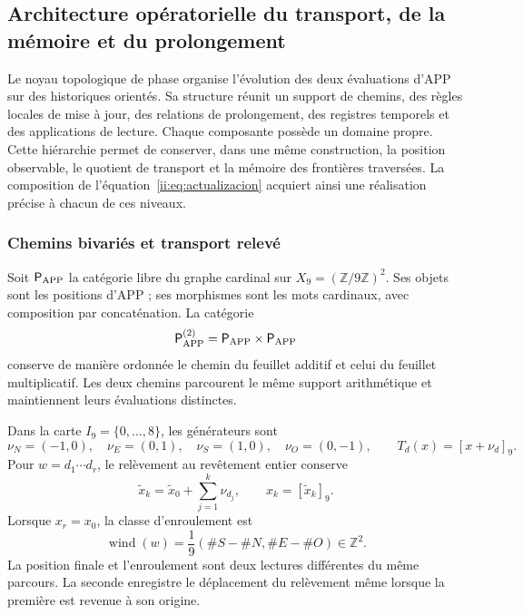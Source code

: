 \subsection{Architecture opératorielle du transport, de la mémoire et du prolongement}
\label{ii:ii:tpk-arquitectura}

Le noyau topologique de phase organise l'évolution des deux évaluations d'APP sur des historiques orientés. Sa structure réunit un support de chemins, des règles locales de mise à jour, des relations de prolongement, des registres temporels et des applications de lecture. Chaque composante possède un domaine propre. Cette hiérarchie permet de conserver, dans une même construction, la position observable, le quotient de transport et la mémoire des frontières traversées. La composition de l'équation~\eqref{ii:eq:actualizacion} acquiert ainsi une réalisation précise à chacun de ces niveaux.

\subsubsection{Chemins bivariés et transport relevé}

Soit \(\mathsf P_{\rm APP}\) la catégorie libre du graphe cardinal sur \(X_9=(\mathbb Z/9\mathbb Z)^2\). Ses objets sont les positions d'APP ; ses morphismes sont les mots cardinaux, avec composition par concaténation. La catégorie
\[
 \mathsf P_{\rm APP}^{(2)}
 =\mathsf P_{\rm APP}\times\mathsf P_{\rm APP}
\]
conserve de manière ordonnée le chemin du feuillet additif et celui du feuillet multiplicatif. Les deux chemins parcourent le même support arithmétique et maintiennent leurs évaluations distinctes.

Dans la carte \(I_9=\{0,\ldots,8\}\), les générateurs sont
\[
 \nu_N=(-1,0),\quad\nu_E=(0,1),\quad
 \nu_S=(1,0),\quad\nu_O=(0,-1),
 \qquad T_d(x)=[x+\nu_d]_9.
\]
Pour \(w=d_1\cdots d_r\), le relèvement au revêtement entier conserve
\[
 \widetilde x_k=\widetilde x_0+\sum_{j=1}^{k}\nu_{d_j},
 \qquad x_k=[\widetilde x_k]_9.
\]
Lorsque \(x_r=x_0\), la classe d'enroulement est
\begin{equation}
 \operatorname{wind}(w)
 =\frac{1}{9}(\#S-\#N,\#E-\#O)\in\mathbb Z^2.
 \label{ii:ii:tpk-enrollamiento}
\end{equation}
La position finale et l'enroulement sont deux lectures différentes du même parcours. La seconde enregistre le déplacement du relèvement même lorsque la première est revenue à son origine.

